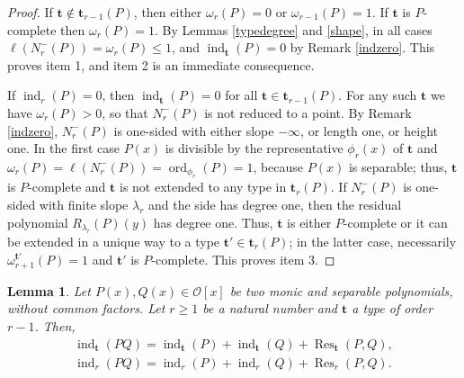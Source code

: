 \documentclass{amsart}
\newtheorem{lemma}[theorem]{Lemma}
\def\op{\operatorname}
\def\as#1{\renewcommand\arraystretch{#1}}
\def\ind{\op{ind}}
\def\la{\lambda}
\def\om{\omega}
\def\oo{{\mathcal O}}
\def\ord{\op{ord}}
\def\res{\op{Res}}
\def\ty{\mathbf{t}}
\def\zpx{\oo[x]}
\begin{document}
\begin{proof}
If $\ty\not\in\ty_{r-1}(P)$, then either $\om_r(P)=0$ or $\om_{r-1}(P)=1$. If $\ty$ is $P$-complete then $\om_r(P)=1$. By Lemmas \ref{typedegree} and \ref{shape}, in all cases $\ell(N_r^-(P))=\om_r(P)\le 1$, and $\ind_{\ty}(P)=0$ by Remark \ref{indzero}. This proves item 1, and item 2 is an immediate consequence.

If $\ind_r(P)=0$, then $\ind_{\ty}(P)=0$ for all $\ty\in\ty_{r-1}(P)$. For any such $\ty$ we have $\om_r(P)>0$, so that $N_r^-(P)$ is not reduced to a point. By Remark \ref{indzero}, $N_r^-(P)$ is one-sided with either slope $-\infty$, or length one, or height one. In the first case $P(x)$ is divisible by the representative $\phi_r(x)$ of $\ty$ and $\om_r(P)=\ell(N_r^-(P))=\ord_{\phi_r}(P)=1$, because $P(x)$ is separable; thus, $\ty$ is $P$-complete and $\ty$ is not extended to any type in $\ty_r(P)$. If $N_r^-(P)$ is one-sided with finite slope $\la_r$ and the side has degree one, then the residual polynomial $R_{\la_r}(P)(y)$ has degree one. Thus, $\ty$ is either $P$-complete or it can be extended in a unique way to a type $\ty'\in \ty_r(P)$; in the latter case, necessarily $\om_{r+1}^{\ty'}(P)=1$ and $\ty'$ is $P$-complete. This proves item 3. 
\end{proof}

\begin{lemma}\label{indres}
Let $P(x),Q(x)\in\zpx$ be two monic and separable polynomials, without common factors. Let $r\ge 1$ be a natural number and $\ty$ a type of order $r-1$. Then,
$$\as{1.6}
\begin{array}{l}
\ind_\ty(PQ)=\ind_\ty(P)+\ind_\ty(Q)+\res_\ty(P,Q),\\
\ind_r(PQ)=\ind_r(P)+\ind_r(Q)+\res_r(P,Q). 
\end{array}
$$
\end{lemma}
\end{document}

